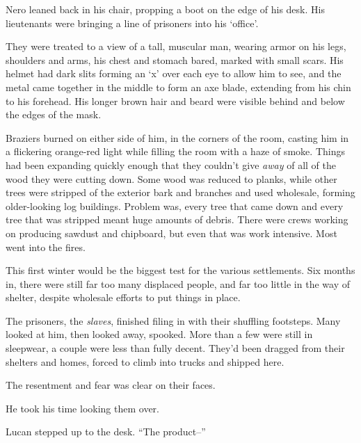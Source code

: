 





Nero leaned back in his chair, propping a boot on the edge of his desk.  His lieutenants were bringing a line of prisoners into his `office'.



They were treated to a view of a tall, muscular man, wearing armor on his legs, shoulders and arms, his chest and stomach bared, marked with small scars.  His helmet had dark slits forming an `x' over each eye to allow him to see, and the metal came together in the middle to form an axe blade, extending from his chin to his forehead.  His longer brown hair and beard were visible behind and below the edges of the mask.



Braziers burned on either side of him, in the corners of the room, casting him in a flickering orange-red light while filling the room with a haze of smoke.  Things had been expanding quickly enough that they couldn't give \emph{away} of all of the wood they were cutting down.  Some wood was reduced to planks, while other trees were stripped of the exterior bark and branches and used wholesale, forming older-looking log buildings.  Problem was, every tree that came down and every tree that was stripped meant huge amounts of debris.  There were crews working on producing sawdust and chipboard, but even that was work intensive.  Most went into the fires.



This first winter would be the biggest test for the various settlements.  Six months in, there were still far too many displaced people, and far too little in the way of shelter, despite wholesale efforts to put things in place.



The prisoners, the \emph{slaves}, finished filing in with their shuffling footsteps.  Many looked at him, then looked away, spooked.  More than a few were still in sleepwear, a couple were less than fully decent.  They'd been dragged from their shelters and homes, forced to climb into trucks and shipped here.



The resentment and fear was clear on their faces.



He took his time looking them over.



Lucan stepped up to the desk.  ``The product--''



